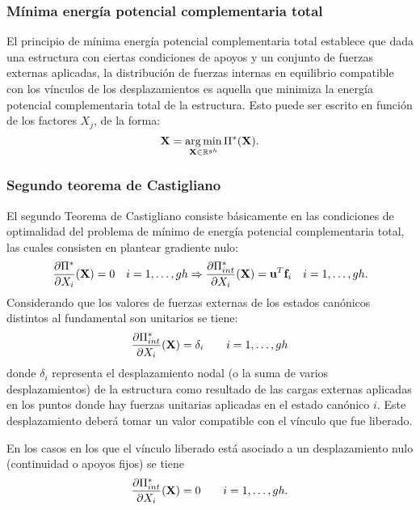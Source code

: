 \subsubsection{Mínima energía potencial complementaria total}

El principio de mínima energía potencial complementaria total establece que dada una estructura con ciertas condiciones de apoyos y un conjunto de fuerzas externas aplicadas, la distribución de fuerzas internas en equilibrio compatible con los vínculos de los desplazamientos es aquella que minimiza la energía potencial complementaria total de la estructura. Esto puede ser escrito en función de los factores $X_j$, de la forma:
%
\begin{equation}
\textbf{X} = \operatorname*{arg\,min}_{\textbf{X} \in {\mathbb R}^{gh} } \Pi^*(\textbf{X}).
\end{equation}

\subsubsection{Segundo teorema de Castigliano}

El segundo Teorema de Castigliano consiste básicamente en las condiciones de optimalidad del problema de mínimo de energía potencial complementaria total, %
%
las cuales consisten en plantear gradiente nulo:
%
\begin{equation}
\frac{\partial \Pi^*}{ \partial X_i}({\bf X}) = 0  \quad i=1,\dots,gh \Rightarrow 
\frac{\partial \Pi_{int}^*}{ \partial X_i}({\bf X}) = {\bf u}^T {\bf f}_i \quad i=1,\dots,gh.
\end{equation}
%
Considerando que los valores de fuerzas externas de los estados canónicos distintos al fundamental son unitarios se tiene:
%
\begin{equation}
\frac{\partial \Pi_{int}^*}{ \partial X_i}({\bf X}) =  \delta_i \qquad i=1,\dots,gh
\end{equation}
%
donde $\delta_i$ representa el desplazamiento nodal (o la suma de varios desplazamientos) de la estructura como resultado de las cargas externas aplicadas en los puntos donde hay fuerzas unitarias aplicadas en el estado canónico $i$. %
%
Este desplazamiento deberá tomar un valor compatible con el vínculo que fue liberado. %

En los casos en los que el vínculo liberado está asociado a un desplazamiento nulo (continuidad o apoyos fijos) se tiene
%
\begin{equation}
\frac{\partial \Pi_{int}^*}{ \partial X_i}({\bf X}) = 0 \qquad i=1,\dots,gh.
\end{equation}

